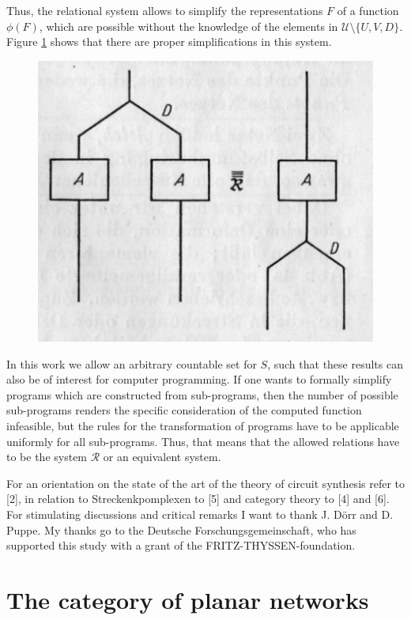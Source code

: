 \documentclass{article}
\begin{document}
Thus, the relational system allows to simplify the representations $F$ of a function $\phi(F)$, which are possible without the knowledge of the elements in $\mathcal{U} \setminus \{ U, V, D \}$. Figure \ref{fig:figure2} shows that there are proper simplifications in this system.

\begin{figure}
\includegraphics[]{figure2.png}
\caption{}
\label{fig:figure2}
\end{figure}

In this work we allow an arbitrary countable set for $S$, such that these results can also be of interest for computer programming. If one wants to formally simplify programs which are constructed from sub-programs, then the number of possible sub-programs renders the specific consideration of the computed function infeasible, but the rules for the transformation of programs have to be applicable uniformly for all sub-programs. Thus, that means that the allowed relations have to be the system
$\mathcal{R}$ or an equivalent system.

For an orientation on the state of the art of the theory of circuit synthesis refer to [2], in relation to Streckenkpomplexen to [5] and category theory to [4] and [6].
For stimulating discussions and critical remarks I want to thank J. D\"{o}rr and D. Puppe. My thanks go to the Deutsche Forschungsgemeinschaft, who has supported this study with a grant of the FRITZ-THYSSEN-foundation.

\section{The category of planar networks }
\end{document}
